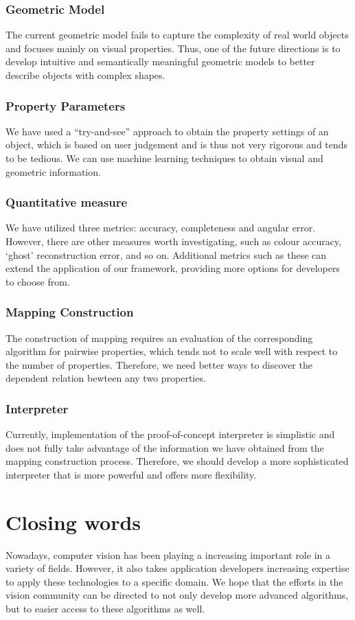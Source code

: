 \subsubsection{Geometric Model}
The current geometric model fails to capture the complexity of real world objects and focuses mainly on visual properties. Thus, one of the future directions is to develop intuitive and semantically meaningful geometric models to better describe objects with complex shapes.

\subsubsection{Property Parameters}
We have used a ``try-and-see'' approach to obtain the property settings of an object, which is based on user judgement and is thus not very rigorous and tends to be tedious. We can use machine learning techniques to obtain visual and geometric information.

\subsubsection{Quantitative measure}
We have utilized three metrics: accuracy, completeness and angular error. However, there are other measures worth investigating, such as colour accuracy, `ghost' reconstruction error, and so on. Additional metrics such as these can extend the application of our framework, providing more options for developers to choose from.

\subsubsection{Mapping Construction}
The construction of mapping requires an evaluation of the corresponding algorithm for pairwise properties, which tends not to scale well with respect to the number of properties. Therefore, we need better ways to discover the dependent relation bewteen any two properties.

\subsubsection{Interpreter}
Currently, implementation of the proof-of-concept interpreter is simplistic and does not fully take advantage of the information we have obtained from the mapping construction process. Therefore, we should develop a more sophisticated interpreter that is more powerful and offers more flexibility.

\section{Closing words}
Nowadays, computer vision has been playing a increasing important role in a variety of fields. However, it also takes application developers increasing expertise to apply these technologies to a specific domain. We hope that the efforts in the vision community can be directed to not only develop more advanced algorithms, but to easier access to these algorithms as well.